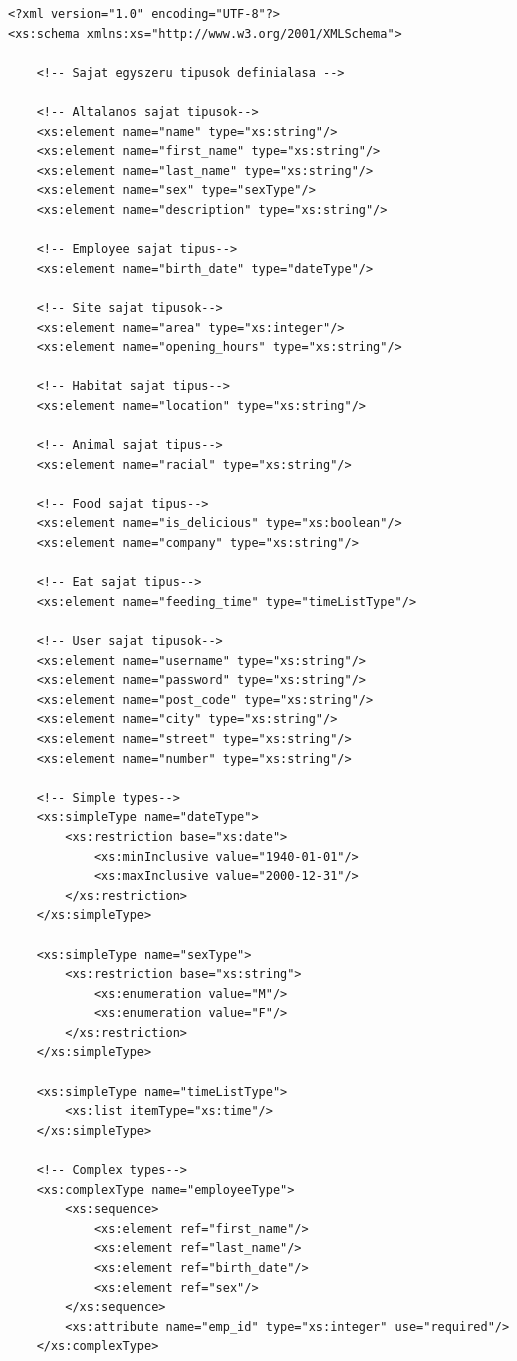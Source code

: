 \documentclass[12pt]{report}
\begin{document}
\begin{lstlisting}[caption={Az XSD dokumentum}]
<?xml version="1.0" encoding="UTF-8"?>
<xs:schema xmlns:xs="http://www.w3.org/2001/XMLSchema">
	
	<!-- Sajat egyszeru tipusok definialasa -->
	
	<!-- Altalanos sajat tipusok-->
	<xs:element name="name" type="xs:string"/>
	<xs:element name="first_name" type="xs:string"/>
	<xs:element name="last_name" type="xs:string"/>
	<xs:element name="sex" type="sexType"/>
	<xs:element name="description" type="xs:string"/>
	
	<!-- Employee sajat tipus-->
	<xs:element name="birth_date" type="dateType"/>
	
	<!-- Site sajat tipusok-->
	<xs:element name="area" type="xs:integer"/>
	<xs:element name="opening_hours" type="xs:string"/>
	
	<!-- Habitat sajat tipus-->
	<xs:element name="location" type="xs:string"/>
	
	<!-- Animal sajat tipus-->
	<xs:element name="racial" type="xs:string"/>
	
	<!-- Food sajat tipus-->
	<xs:element name="is_delicious" type="xs:boolean"/>
	<xs:element name="company" type="xs:string"/>
	
	<!-- Eat sajat tipus-->
	<xs:element name="feeding_time" type="timeListType"/>
	
	<!-- User sajat tipusok-->
	<xs:element name="username" type="xs:string"/>
	<xs:element name="password" type="xs:string"/>
	<xs:element name="post_code" type="xs:string"/>
	<xs:element name="city" type="xs:string"/>
	<xs:element name="street" type="xs:string"/>
	<xs:element name="number" type="xs:string"/>
	
	<!-- Simple types-->
	<xs:simpleType name="dateType">
		<xs:restriction base="xs:date">
			<xs:minInclusive value="1940-01-01"/>
			<xs:maxInclusive value="2000-12-31"/>
		</xs:restriction>
	</xs:simpleType>
	
	<xs:simpleType name="sexType">
		<xs:restriction base="xs:string">
			<xs:enumeration value="M"/>
			<xs:enumeration value="F"/>
		</xs:restriction>
	</xs:simpleType>
	
	<xs:simpleType name="timeListType">
		<xs:list itemType="xs:time"/>
	</xs:simpleType>
	
	<!-- Complex types-->
	<xs:complexType name="employeeType">
		<xs:sequence>
			<xs:element ref="first_name"/>
			<xs:element ref="last_name"/>
			<xs:element ref="birth_date"/>
			<xs:element ref="sex"/>
		</xs:sequence>
		<xs:attribute name="emp_id" type="xs:integer" use="required"/>
	</xs:complexType>
	

\end{lstlisting}
\end{document}
